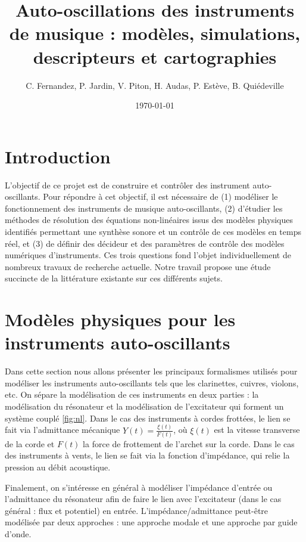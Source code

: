 \documentclass[atiam, article]{rapport} %
\title{Auto-oscillations des instruments de musique : modèles, simulations, descripteurs et cartographies}
\author{C. Fernandez, P. Jardin, V. Piton, H. Audas, P. Estève, B. Quiédeville} %
\date{\today}
\begin{document}
\maketitle

\tocpage

\section*{Introduction}
L'objectif de ce projet est de construire et contrôler des instrument auto-oscillants. Pour répondre à cet objectif, il est nécessaire de (1) modéliser le fonctionnement des instruments de musique auto-oscillants, (2) d'étudier les méthodes de résolution des équations non-linéaires issus des modèles physiques identifiés permettant une synthèse sonore et un contrôle de ces modèles en temps réel, et (3) de définir des décideur et des paramètres de contrôle des modèles numériques d'instruments. Ces trois questions fond l'objet individuellement de nombreux travaux de recherche actuelle. Notre travail propose une étude succincte de la littérature existante sur ces différents sujets. 


\section{Modèles physiques pour les instruments auto-oscillants}\label{sec:models physiques}
Dans cette section nous allons présenter les principaux formalismes utilisés pour modéliser les instruments auto-oscillants tels que les clarinettes, cuivres, violons, etc. 
On sépare la modélisation de ces instruments en deux parties : la modélisation du résonateur et la modélisation de l'excitateur qui forment un système couplé \ref{fig:nl}. Dans le cas des instruments à cordes frottées, le lien se fait via l'admittance mécanique $Y(t)=\frac{\xi(t)}{F(t)}$, où $\xi(t)$ est la vitesse transverse de la corde et $F(t)$ la force de frottement de l'archet sur la corde. Dans le cas des instruments à vents, le lien se fait via la fonction d'impédance, qui relie la pression au débit acoustique. 

Finalement, on s'intéresse en général à modéliser l'impédance d'entrée ou l'admittance du résonateur afin de faire le lien avec l'excitateur (dans le cas général : flux et potentiel) en entrée. L'impédance/admittance peut-être modélisée par deux approches : une approche modale et une approche par guide d'onde. 
\end{document}

